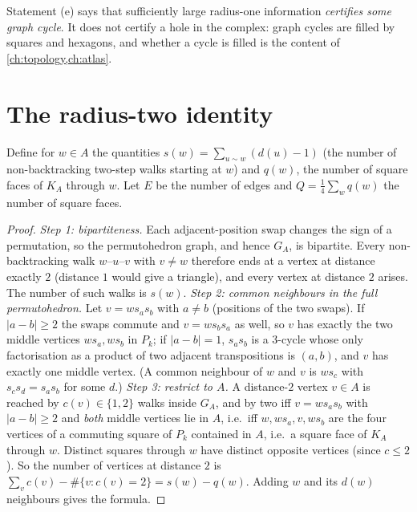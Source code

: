 \begin{remark}
Statement (e) says that sufficiently large radius-one information \emph{certifies some graph cycle}. It does not certify a hole in the complex: graph cycles are filled by squares and hexagons, and whether a cycle is filled is the content of \cref{ch:topology,ch:atlas}.
\end{remark}

\section{The radius-two identity}\label{sec:radius2}
Define for $w\in A$ the quantities $s(w)=\sum_{u\sim w}(d(u)-1)$ (the number of non-backtracking two-step walks starting at $w$) and $q(w)$, the number of square faces of $K_A$ through $w$. Let $E$ be the number of edges and $Q=\tfrac14\sum_wq(w)$ the number of square faces.
\begin{proof}
\emph{Step 1: bipartiteness.} Each adjacent-position swap changes the sign of a permutation, so the permutohedron graph, and hence $G_A$, is bipartite. Every non-backtracking walk $w$--$u$--$v$ with $v\ne w$ therefore ends at a vertex at distance exactly $2$ (distance $1$ would give a triangle), and every vertex at distance $2$ arises. The number of such walks is $s(w)$.
\emph{Step 2: common neighbours in the full permutohedron.} Let $v=ws_as_b$ with $a\ne b$ (positions of the two swaps). If $|a-b|\ge2$ the swaps commute and $v=ws_bs_a$ as well, so $v$ has exactly the two middle vertices $ws_a,ws_b$ in $P_k$; if $|a-b|=1$, $s_as_b$ is a $3$-cycle whose only factorisation as a product of two adjacent transpositions is $(a,b)$, and $v$ has exactly one middle vertex. (A common neighbour of $w$ and $v$ is $ws_c$ with $s_cs_d=s_as_b$ for some $d$.)
\emph{Step 3: restrict to $A$.} A distance-$2$ vertex $v\in A$ is reached by $c(v)\in\{1,2\}$ walks inside $G_A$, and by two iff $v=ws_as_b$ with $|a-b|\ge2$ and \emph{both} middle vertices lie in $A$, i.e.\ iff $w,ws_a,v,ws_b$ are the four vertices of a commuting square of $P_k$ contained in $A$, i.e.\ a square face of $K_A$ through $w$. Distinct squares through $w$ have distinct opposite vertices (since $c\le2$). So the number of vertices at distance $2$ is $\sum_vc(v)-\#\{v:c(v)=2\}=s(w)-q(w)$. Adding $w$ and its $d(w)$ neighbours gives the formula.
\end{proof}
